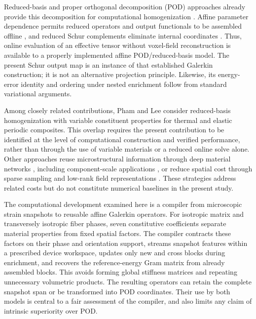 \documentclass[pdflatex,sn-basic,Numbered]{sn-jnl}
\begin{document}
Reduced-basis and proper orthogonal decomposition (POD) approaches already
provide this decomposition for computational homogenization
\cite{boyaval2008homogenization,yvonnet2007r3m,fritzen2013hybrid,
hernandez2014highperformance,abdulle2014reducedhomogenization}.
Affine parameter dependence permits reduced operators and output functionals
to be assembled offline \cite{prudhomme2002reliable,quarteroni2011certified},
and reduced Schur complements eliminate internal coordinates
\cite{huynh2013scrbe}. Thus, online evaluation of an effective tensor without
voxel-field reconstruction is available to a properly implemented affine
POD/reduced-basis model. The present Schur output map is an instance of that
established Galerkin construction; it is not an alternative projection
principle. Likewise, its energy-error identity and ordering under nested
enrichment follow from standard variational arguments.

Among closely related contributions, Pham and Lee \cite{pham2025rbhm}
consider reduced-basis homogenization with variable constituent properties
for thermal and elastic periodic composites. This overlap requires the
present contribution to be identified at the level of computational
construction and verified performance, rather than through the use of
variable materials or a reduced online solve alone. Other approaches reuse
microstructural information through deep material networks
\cite{liu2019dmn,gajek2020dmn}, including component-scale applications
\cite{gajek2021fedmn,gajek2022thermomechanical}, or reduce spatial cost through
sparse sampling and low-rank field representations
\cite{kochmann2019sparsefft,vondrejc2020lowrank}. These strategies address
related costs but do not constitute numerical baselines in the present study.

The computational development examined here is a compiler from microscopic
strain snapshots to reusable affine Galerkin operators. For isotropic matrix
and transversely isotropic fiber phases, seven constitutive coefficients
separate material properties from fixed spatial factors. The compiler
contracts these factors on their phase and orientation support, streams
snapshot features within a prescribed device workspace, updates only new
and cross blocks during enrichment, and recovers the reference-energy Gram
matrix from already assembled blocks. This avoids forming global stiffness
matrices and repeating unnecessary volumetric products. The resulting
operators can retain the complete snapshot span or be transformed into POD
coordinates. Their use by both models is central to a fair assessment of the
compiler, and also limits any claim of intrinsic superiority over POD.
\end{document}
